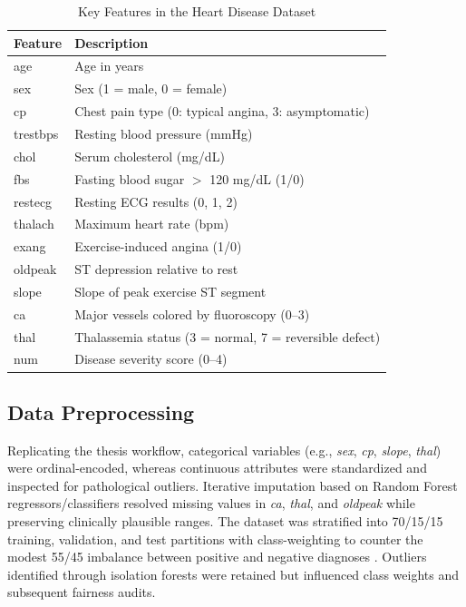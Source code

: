 \documentclass[conference]{IEEEtran}
\begin{document}
\begin{table}[t]
  \caption{Key Features in the Heart Disease Dataset}
  \label{tab:features}
  \centering
  \begin{tabular}{p{} p{}}
    \toprule
    Feature & Description \\
    \midrule
    age & Age in years \\
    sex & Sex (1 = male, 0 = female) \\
    cp & Chest pain type (0: typical angina, 3: asymptomatic) \\
    trestbps & Resting blood pressure (mmHg) \\
    chol & Serum cholesterol (mg/dL) \\
    fbs & Fasting blood sugar $>$ 120 mg/dL (1/0) \\
    restecg & Resting ECG results (0, 1, 2) \\
    thalach & Maximum heart rate (bpm) \\
    exang & Exercise-induced angina (1/0) \\
    oldpeak & ST depression relative to rest \\
    slope & Slope of peak exercise ST segment \\
    ca & Major vessels colored by fluoroscopy (0--3) \\
    thal & Thalassemia status (3 = normal, 7 = reversible defect) \\
    num & Disease severity score (0--4) \\
    \bottomrule
  \end{tabular}
\end{table}

\subsection{Data Preprocessing}
Replicating the thesis workflow, categorical variables (e.g., \textit{sex}, \textit{cp}, \textit{slope}, \textit{thal}) were ordinal-encoded, whereas continuous attributes were standardized and inspected for pathological outliers. Iterative imputation based on Random Forest regressors/classifiers resolved missing values in \textit{ca}, \textit{thal}, and \textit{oldpeak} while preserving clinically plausible ranges. The dataset was stratified into 70/15/15 training, validation, and test partitions with class-weighting to counter the modest 55/45 imbalance between positive and negative diagnoses \cite{pedregosa2011scikit, chawla2002smote}. Outliers identified through isolation forests were retained but influenced class weights and subsequent fairness audits.
\end{document}
